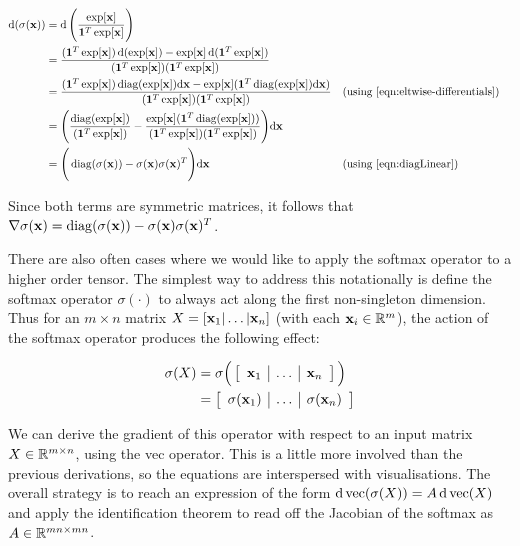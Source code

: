 \begin{align}
  \operatorname{\text{d}}(\sigma(\mathbf{x})) &= \operatorname{\text{d}} \Bigg( \frac{\exp[\mathbf{x}]}{\mathbf{1}^T \exp[\mathbf{x}]} \Bigg) \\
                 &= \frac{(\mathbf{1}^T \exp[\mathbf{x}]) \operatorname{\text{d}} (\exp[\mathbf{x}]) - \exp[\mathbf{x}] \operatorname{\text{d}} (\mathbf{1}^T \exp[\mathbf{x}])}{(\mathbf{1}^T \exp[\mathbf{x}])(\mathbf{1}^T \exp[\mathbf{x}])} \\
                 &= \frac{(\mathbf{1}^T \exp[\mathbf{x}]) \operatorname{diag}(\exp[\mathbf{x}]){\operatorname{\text{d}}} \mathbf{x} - \exp[\mathbf{x}] (\mathbf{1}^T \operatorname{diag}(\exp[\mathbf{x}]){\operatorname{\text{d}}}\mathbf{x})}{(\mathbf{1}^T \exp[\mathbf{x}])(\mathbf{1}^T \exp[\mathbf{x}])} && \text{(using \ref{eqn:eltwise-differentials})}\\
                 &= \Bigg(\frac{\operatorname{diag}(\exp[\mathbf{x}])}{(\mathbf{1}^T \exp[\mathbf{x}])} - \frac{\exp[\mathbf{x}] (\mathbf{1}^T \operatorname{diag}(\exp[\mathbf{x}]))}{(\mathbf{1}^T \exp[\mathbf{x}])(\mathbf{1}^T \exp[\mathbf{x}])}\Bigg){\operatorname{\text{d}}}\mathbf{x} \\
                  &= \Bigg(\operatorname{diag}(\sigma(\mathbf{x})) - \sigma(\mathbf{x})\sigma(\mathbf{x})^T\Bigg){\operatorname{\text{d}}}\mathbf{x} && \text{(using \ref{eqn:diagLinear})} \label{eqn:vectorSoftmax}
\end{align}

Since both terms are symmetric matrices, it follows that $\nabla\sigma(\mathbf{x}) = \operatorname{diag}(\sigma(\mathbf{x})) - \sigma(\mathbf{x})\sigma(\mathbf{x})^T$.  

There are also often cases where we would like to apply the softmax operator to a higher order tensor.  The simplest way to address this notationally is define the softmax operator $\sigma(\cdot)$ to always act along the first non-singleton dimension. Thus for an $m \times n$ matrix $X = [\mathbf{x}_1 | \dots | \mathbf{x}_n]$ (with each $\mathbf{x}_i \in \mathbb{R}^m$), the action of the softmax operator produces the following effect:

\begin{align*}
  \sigma(X) &= \sigma \Big( \left[\begin{array}{c|c|c}
  \mathbf{x}_1 & \dots & \mathbf{x}_n
\end{array}\right] \Big) \\
 &= \left[\begin{array}{c|c|c}
  \sigma(\mathbf{x}_1) & \dots & \sigma(\mathbf{x}_n)
\end{array}\right]
\end{align*}

We can derive the gradient of this operator with respect to an input matrix $X \in \mathbb{R}^{m \times n}$, using the vec operator. This is a little more involved than the previous derivations, so the equations are interspersed with visualisations.  The overall strategy is to reach an expression of the form $\operatorname{\text{d}} \operatorname{vec}(\sigma(X)) = A \operatorname{\text{d}} \operatorname{vec}(X)$ and apply the identification theorem \citep{magnus1988matrix} to read off the Jacobian of the softmax as $A \in \mathbb{R}^{mn \times mn}$.


